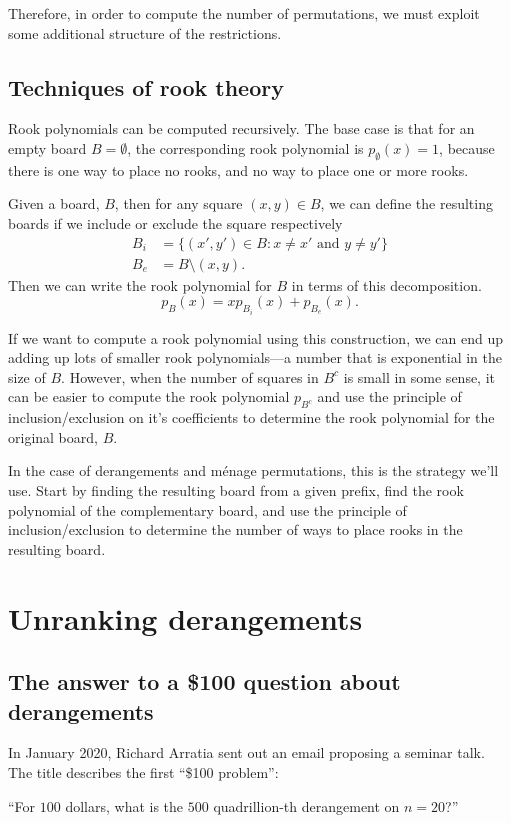 Therefore, in order to compute the number of permutations, we must exploit some
additional structure of the restrictions.

\subsection{Techniques of rook theory}
Rook polynomials can be computed recursively. The base case is that
for an empty board $B = \emptyset$, the corresponding rook polynomial is
$p_\emptyset(x) = 1$, because there is one way to place no rooks, and no way
to place one or more rooks.
\begin{lemma}
  Given a board, $B$, then for any square $(x,y) \in B$, we can define
  the resulting boards if we include or exclude the square respectively
  \begin{align}
    B_i &= \{(x',y') \in B : x \neq x' \text{ and } y \neq y'\} \\
    B_e &= B \setminus {(x,y)}.
  \end{align}
  Then we can write the rook polynomial for $B$ in terms of this decomposition.
  \begin{equation}
    p_B(x) = xp_{B_i}(x) + p_{B_e}(x).
  \end{equation}
  \label{lemma:rookPolynomialRecursion}
\end{lemma}

If we want to compute a rook polynomial using this construction, we can end
up adding up lots of smaller rook polynomials---a number that is exponential in
the size of $B$.
However, when the number of squares in $B^c$ is small in some sense, it can be
easier to compute the rook polynomial $p_{B^c}$ and use the principle of
inclusion/exclusion on it's coefficients to determine the rook polynomial for
the original board, $B$.

In the case of derangements and m\'enage permutations, this is the strategy
we'll use.
Start by finding the resulting board from a given prefix,
find the rook polynomial of the complementary board, and
use the principle of inclusion/exclusion to determine the number of ways to
place rooks in the resulting board.

\section{Unranking derangements}

\subsection{The answer to a \$100 question about derangements}
In January 2020, Richard Arratia sent out an email proposing a seminar talk.
The title describes the first ``\$100 problem'':
\begin{problem}
``For $100$ dollars, what is the $500$ quadrillion-th derangement on $n=20$?''
\end{problem}

